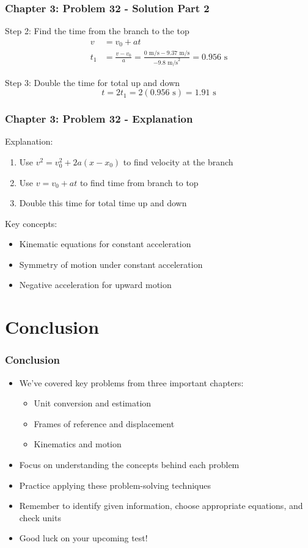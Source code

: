 \documentclass{beamer}
\begin{document}
\begin{frame}
\frametitle{Chapter 3: Problem 32 - Solution Part 2}
Step 2: Find the time from the branch to the top
\begin{align*}
v &= v_0 + at \\
t_1 &= \frac{v - v_0}{a} = \frac{0 \text{ m/s} - 9.37 \text{ m/s}}{-9.8 \text{ m/s}^2} = 0.956 \text{ s}
\end{align*}

Step 3: Double the time for total up and down
\begin{equation*}
t = 2t_1 = 2(0.956 \text{ s}) = 1.91 \text{ s}
\end{equation*}
\end{frame}

\begin{frame}
\frametitle{Chapter 3: Problem 32 - Explanation}
Explanation:
\begin{enumerate}
    \item Use $v^2 = v_0^2 + 2a(x-x_0)$ to find velocity at the branch
    \item Use $v = v_0 + at$ to find time from branch to top
    \item Double this time for total time up and down
\end{enumerate}
Key concepts:
\begin{itemize}
    \item Kinematic equations for constant acceleration
    \item Symmetry of motion under constant acceleration
    \item Negative acceleration for upward motion
\end{itemize}
\end{frame}

\section{Conclusion}

\begin{frame}
\frametitle{Conclusion}
\begin{itemize}
    \item We've covered key problems from three important chapters:
    \begin{itemize}
        \item Unit conversion and estimation
        \item Frames of reference and displacement
        \item Kinematics and motion
    \end{itemize}
    \item Focus on understanding the concepts behind each problem
    \item Practice applying these problem-solving techniques
    \item Remember to identify given information, choose appropriate equations, and check units
    \item Good luck on your upcoming test!
\end{itemize}
\end{frame}
\end{document}
